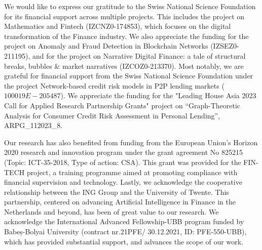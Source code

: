 \documentclass{article}
\begin{document}
We would like to express our gratitude to the Swiss National Science Foundation for its financial support across multiple projects. This includes the project on Mathematics and Fintech (IZCNZ0-174853), which focuses on the digital transformation of the Finance industry. We also appreciate the funding for the project on Anomaly and Fraud Detection in Blockchain Networks (IZSEZ0-211195), and for the project on Narrative Digital Finance: a tale of structural breaks, bubbles \& market narratives (IZCOZ0-213370). Most notably, we are grateful for financial support from the Swiss National Science Foundation under the project Network-based credit risk models in P2P lending markets ($100019E-205487$). We appreciate the funding for the "Leading House Asia 2023 Call for Applied Research Partnership Grants" project on “Graph-Theoretic Analysis for Consumer Credit Risk Assessment in Personal Lending”, ARPG\_112023\_8.
 
Our research has also benefited from funding from the European Union's Horizon 2020 research and innovation program under the grant agreement No 825215 (Topic: ICT-35-2018, Type of action: CSA). This grant was provided for the FIN-TECH project, a training programme aimed at promoting compliance with financial supervision and technology.
Lastly, we acknowledge the cooperative relationship between the ING Group and the University of Twente. This partnership, centered on advancing Artificial Intelligence in Finance in the Netherlands and beyond, has been of great value to our research.  We acknowledge the International Advanced Fellowship-UBB program funded by Babeș-Bolyai University (contract nr.21PFE/ 30.12.2021, ID: PFE-550-UBB), which has provided substantial support, and advances the scope of our work.

\newpage

\end{document}
